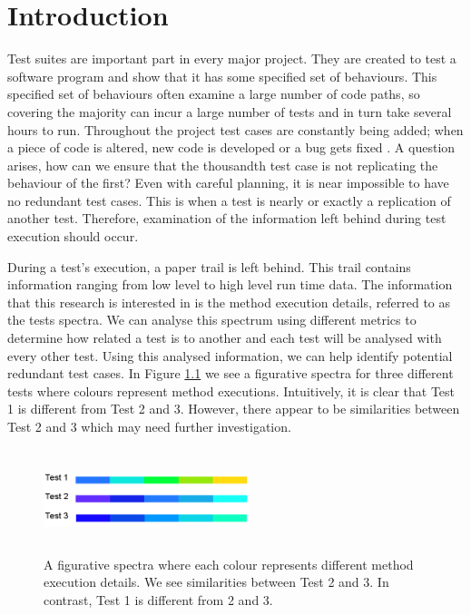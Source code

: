 \chapter{Introduction}\label{C:intro}

Test suites are important part in every major project. They are created to test a software program and show that it has some specified set of behaviours. This specified set of behaviours often examine a large number of code paths, so covering the majority can incur a large number of tests and in turn take several hours to run. Throughout the project test cases are constantly being added; when a piece of code is altered, new code is developed or a bug gets fixed \cite{issuetrack,whentotest}. A question arises, how can we ensure that the thousandth test case is not replicating the behaviour of the first? Even with careful planning, it is near impossible to have no redundant test cases. This is when a test is nearly or exactly a replication of another test. Therefore, examination of the information left behind during test execution should occur. 

During a test's execution, a paper trail is left behind. This trail contains information ranging from low level to high level run time data. The information that this research is interested in is the method execution details, referred to as the tests spectra. We can analyse this spectrum using different metrics to determine how related a test is to another and each test will be analysed with every other test. Using this analysed information, we can help identify potential redundant test cases. In Figure \ref{fig:spectra} we see a figurative spectra for three different tests where colours represent method executions. Intuitively, it is clear that Test 1 is different from Test 2 and 3. However, there appear to be similarities between Test 2 and 3 which may need further investigation.

\begin{figure}[h]
\centering
\includegraphics[width=6cm,height=3cm]{spectra.png}
\caption{A figurative spectra where each colour represents different method execution details. We see similarities between Test 2 and 3. In contrast, Test 1 is different from 2 and 3. }
\label{fig:spectra}
\end{figure}


